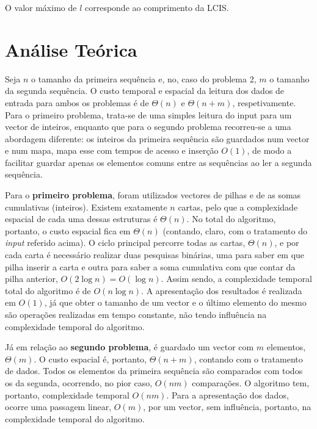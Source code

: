 \documentclass[12pt]{article}
\begin{document}
\vspace{0.5mm}
O valor máximo de $l$ corresponde ao comprimento da LCIS.

\section{Análise Teórica}
Seja $n$ o tamanho da primeira sequência e, no, caso do problema 2, $m$ o tamanho da segunda sequência.
O custo temporal e espacial da leitura dos dados de entrada para ambos os problemas é de $\Theta(n)$ e $\Theta(n + m)$, respetivamente. Para o primeiro problema, trata-se de uma simples leitura do input para um vector de inteiros, enquanto que para o segundo problema recorreu-se a uma abordagem diferente: os inteiros da primeira sequência são guardados num vector e num mapa, mapa esse com tempos de acesso e inserção $O(1)$, de modo a facilitar guardar apenas os elementos comuns entre as sequências ao ler a segunda sequência.

\vspace{0.5mm}

Para o \textbf{primeiro problema}, foram utilizados vectores de pilhas e de as somas cumulativas (inteiros). Existem exatamente $n$ cartas, pelo que a complexidade espacial de cada uma dessas estruturas é $\Theta(n)$. No total do algoritmo, portanto, o custo espacial fica em $\Theta(n)$ (contando, claro, com o tratamento do \textit{input} referido acima). O ciclo principal percorre todas as cartas, $\Theta(n)$, e por cada carta é necessário realizar duas pesquisas binárias, uma para saber em que pilha inserir a carta e outra para saber a soma cumulativa com que contar da pilha anterior, $O(2\log{n}) = O(\log{n})$. Assim sendo, a complexidade temporal total do algoritmo é de $O(n\log{n})$. A apresentação dos resultados é realizada em $O(1)$, já que obter o tamanho de um vector e o último elemento do mesmo são operações realizadas em tempo constante, não tendo influência na complexidade temporal do algoritmo.

\vspace{0.5mm}

Já em relação ao \textbf{segundo problema}, é guardado um vector com $m$ elementos, $\Theta(m)$. O custo espacial é, portanto, $\Theta(n + m)$, contando com o tratamento de dados. Todos os elementos da primeira sequência são comparados com todos os da segunda, ocorrendo, no pior caso, $O(nm)$ comparações. O algoritmo tem, portanto, complexidade temporal $O(nm)$. Para a apresentação dos dados, ocorre uma passagem linear, $O(m)$, por um vector, sem influência, portanto, na complexidade temporal do algoritmo.
\end{document}
